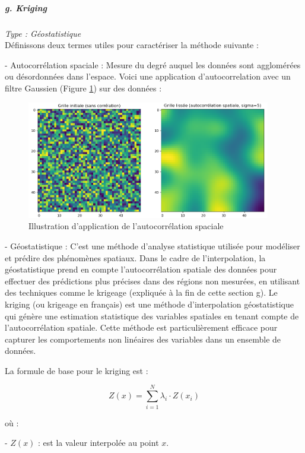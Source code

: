 \subparagraph{g. Kriging \cite{palmer2009, kringing}}
\textit{Type : Géostatistique} \\
\phantom{----}Définissons deux termes utiles pour caractériser la méthode suivante :

- Autocorrélation spaciale : Mesure du degré auquel les données sont agglomérées ou désordonnées dans l'espace. Voici une application d'autocorrelation avec un filtre Gaussien (Figure \ref{fig:autocorrelation}) sur des données :
\begin{figure}[H]
    \centering
    \includegraphics[width=0.95\textwidth]{images/autocorrelation.png}
    \caption{Illustration d'application de l'autocorrélation spaciale}
    \label{fig:autocorrelation}
\end{figure}
- Géostatistique : C'est une méthode d'analyse statistique utilisée pour modéliser et prédire des phénomènes spatiaux. Dans le cadre de l'interpolation, la géostatistique prend en compte l'autocorrélation spatiale des données pour effectuer des prédictions plus précises dans des régions non mesurées, en utilisant des techniques comme le krigeage (expliquée à la fin de cette section g).
Le kriging (ou krigeage en français) est une méthode d'interpolation géostatistique qui génère une estimation statistique des variables spatiales en tenant compte de l'autocorrélation spatiale. Cette méthode est particulièrement efficace pour capturer les comportements non linéaires des variables dans un ensemble de données.

La formule de base pour le kriging est :

\begin{equation}
    Z(x) = \sum_{i=1}^{N} \lambda_i \cdot Z(x_i)
\end{equation}

où :

- \( Z(x) \) : est la valeur interpolée au point \( x \).

\vspace{-0,2 cm}

